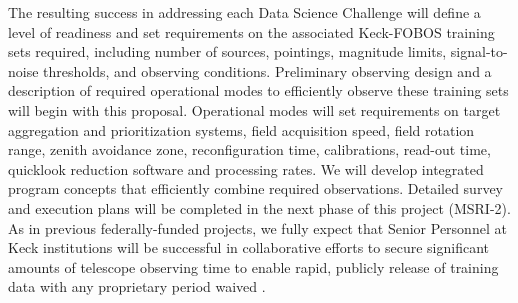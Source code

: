 \documentclass[oneside,11pt]{amsart}
\begin{document}
The resulting success in addressing each Data Science Challenge will define a level of readiness and set requirements
on the associated Keck-FOBOS training sets required, including number of sources, pointings, magnitude limits,
signal-to-noise thresholds, and observing conditions.  Preliminary observing design and a description of required
operational modes to efficiently observe these training sets will begin with this proposal.  Operational modes will set
requirements on target aggregation and prioritization systems, field acquisition speed, field rotation range, zenith
avoidance zone, reconfiguration time, calibrations, read-out time, quicklook reduction software and processing rates.
We will develop integrated program concepts that efficiently combine required observations.  Detailed survey and
execution plans will be completed in the next phase of this project (MSRI-2).  As in previous federally-funded
projects, we fully expect that Senior Personnel at Keck institutions will be successful in collaborative efforts to
secure significant amounts of telescope observing time to enable rapid, publicly release of training data with any
proprietary period waived \citep[e.g.,][]{newman13}.  


\end{document}
